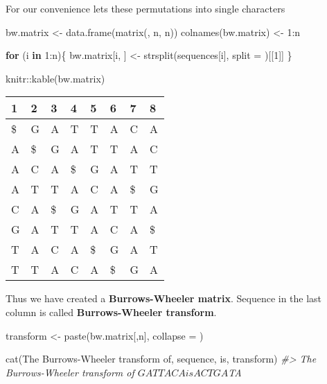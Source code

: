 \documentclass[
]{book}
\newenvironment{Shaded}{\begin{snugshade}}{\end{snugshade}}
\newcommand{\AttributeTok}[1]{\textcolor[rgb]{0.77,0.63,0.00}{#1}}
\newcommand{\CommentTok}[1]{\textcolor[rgb]{0.56,0.35,0.01}{\textit{#1}}}
\newcommand{\ControlFlowTok}[1]{\textcolor[rgb]{0.13,0.29,0.53}{\textbf{#1}}}
\newcommand{\DecValTok}[1]{\textcolor[rgb]{0.00,0.00,0.81}{#1}}
\newcommand{\FunctionTok}[1]{\textcolor[rgb]{0.00,0.00,0.00}{#1}}
\newcommand{\NormalTok}[1]{#1}
\newcommand{\OtherTok}[1]{\textcolor[rgb]{0.56,0.35,0.01}{#1}}
\newcommand{\SpecialCharTok}[1]{\textcolor[rgb]{0.00,0.00,0.00}{#1}}
\newcommand{\StringTok}[1]{\textcolor[rgb]{0.31,0.60,0.02}{#1}}
\begin{document}
For our convenience lets these permutations into single characters

\begin{Shaded}
\begin{Highlighting}[]
\NormalTok{bw.matrix           }\OtherTok{\textless{}{-}} \FunctionTok{data.frame}\NormalTok{(}\FunctionTok{matrix}\NormalTok{(, n, n))}
\FunctionTok{colnames}\NormalTok{(bw.matrix) }\OtherTok{\textless{}{-}} \DecValTok{1}\SpecialCharTok{:}\NormalTok{n}

\ControlFlowTok{for}\NormalTok{ (i }\ControlFlowTok{in} \DecValTok{1}\SpecialCharTok{:}\NormalTok{n)\{}
\NormalTok{  bw.matrix[i, ] }\OtherTok{\textless{}{-}} \FunctionTok{strsplit}\NormalTok{(sequences[i], }\AttributeTok{split =} \StringTok{\textquotesingle{}\textquotesingle{}}\NormalTok{)[[}\DecValTok{1}\NormalTok{]]}
\NormalTok{\}}

\NormalTok{knitr}\SpecialCharTok{::}\FunctionTok{kable}\NormalTok{(bw.matrix)}
\end{Highlighting}
\end{Shaded}

\begin{tabular}{l|l|l|l|l|l|l|l}
\hline
1 & 2 & 3 & 4 & 5 & 6 & 7 & 8\\
\hline
\$ & G & A & T & T & A & C & A\\
\hline
A & \$ & G & A & T & T & A & C\\
\hline
A & C & A & \$ & G & A & T & T\\
\hline
A & T & T & A & C & A & \$ & G\\
\hline
C & A & \$ & G & A & T & T & A\\
\hline
G & A & T & T & A & C & A & \$\\
\hline
T & A & C & A & \$ & G & A & T\\
\hline
T & T & A & C & A & \$ & G & A\\
\hline
\end{tabular}

Thus we have created a \textbf{Burrows-Wheeler matrix}. Sequence in the last column is called \textbf{Burrows-Wheeler transform}.

\begin{Shaded}
\begin{Highlighting}[]
\NormalTok{transform }\OtherTok{\textless{}{-}} \FunctionTok{paste}\NormalTok{(bw.matrix[,n], }\AttributeTok{collapse =} \StringTok{\textquotesingle{}\textquotesingle{}}\NormalTok{)}

\FunctionTok{cat}\NormalTok{(}\StringTok{\textquotesingle{}The Burrows{-}Wheeler transform of\textquotesingle{}}\NormalTok{, }
\NormalTok{    sequence, }\StringTok{\textquotesingle{}is\textquotesingle{}}\NormalTok{, transform)}
\CommentTok{\#\textgreater{} The Burrows{-}Wheeler transform of $GATTACA is ACTGA$TA}
\end{Highlighting}
\end{Shaded}
\end{document}
